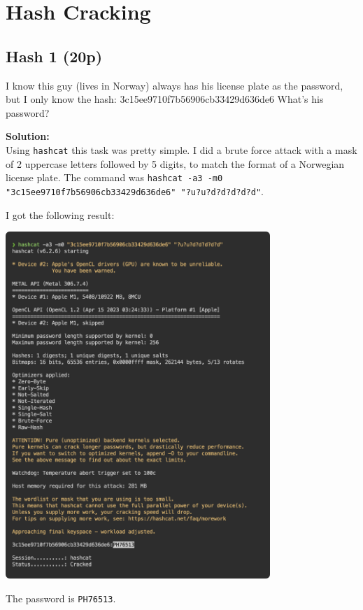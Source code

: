 \section{Hash Cracking}
\subsection{Hash 1 (20p)}
I know this guy (lives in Norway) always has his license plate as the password, but I only know the hash: 3c15ee9710f7b56906cb33429d636de6 What's his password?

\textbf{Solution:}\\
Using \texttt{hashcat} this task was pretty simple.
I did a brute force attack with a mask of 2 uppercase letters followed by 5 digits, to match the format of a Norwegian license plate.
The command was \texttt{hashcat -a3 -m0 "3c15ee9710f7b56906cb33429d636de6" "?u?u?d?d?d?d?d"}.

I got the following result:

\begin{center}
    \includegraphics[width=10cm]{img/Hash cracking/Hash 1/Screenshot 2023-11-10 at 15.52.08.png}
\end{center}

The password is \texttt{PH76513}.
